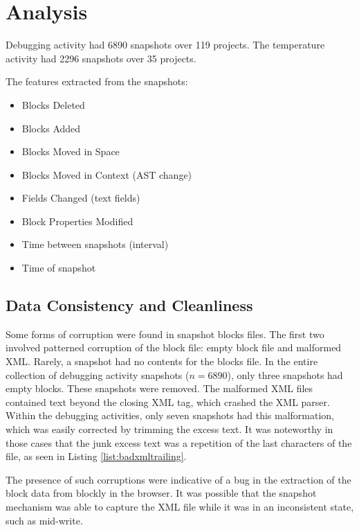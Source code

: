 \chapter{Analysis} 
\label{chap:analysis}
Debugging activity had 6890 snapshots over 119 projects. The temperature activity had 2296 snapshots over 35 projects.

The features extracted from the snapshots:
\begin{itemize}
	\item Blocks Deleted
	\item Blocks Added
	\item Blocks Moved in Space
	\item Blocks Moved in Context (AST change)
	\item Fields Changed (text fields)
	\item Block Properties Modified
	\item Time between snapshots (interval)
	\item Time of snapshot
\end{itemize} 

\section{Data Consistency and Cleanliness}
Some forms of corruption were found in snapshot blocks files. The first two involved patterned corruption of the block file: empty block file and malformed XML. Rarely, a snapshot had no contents for the blocks file. In the entire collection of debugging activity snapshots ($n = 6890$), only three snapshots had empty blocks. These snapshots were removed. The malformed XML files contained text beyond the closing XML tag, which crashed the XML parser. Within the debugging activities, only seven snapshots had this malformation, which was easily corrected by trimming the excess text. It was noteworthy in those cases that the junk excess text was a repetition of the last characters of the file, as seen in Listing \ref{list:badxmltrailing}. 

The presence of such corruptions were indicative of a bug in the extraction of the block data from blockly in the browser. It was possible that the snapshot mechanism was able to capture the XML file while it was in an inconsistent state, such as mid-write. 

